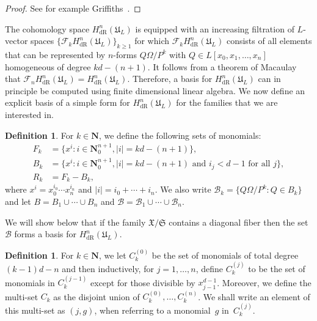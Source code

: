 \documentclass[a4paper,11pt]{article}
\numberwithin{equation}{section}
\providecommand{\abs}[1]{\lvert#1\rvert}                 %
\newcommand{\NN}{\mathbf{N}} %
\providecommand{\HdR}{H_{\text{dR}}}    %
\providecommand{\cB}{\mathcal{B}} %
\theoremstyle{definition}
\newtheorem{defn}[thm]{Definition}
\begin{document}
\begin{proof}
See for example Griffiths~\citep[\S 4]{Griffiths1969}.
\end{proof}

The cohomology space $\HdR^{n}(\mathfrak{U}_L)$ is equipped with 
an increasing filtration of $L$-vector spaces 
$\{\mathcal{F}_k \HdR^{n}(\mathfrak{U}_L) \}_{k \geq 1}$ 
for which $\mathcal{F}_k \HdR^{n}(\mathfrak{U}_L)$ consists of 
all elements that can be represented by $n$-forms $Q \Omega / P^k$ 
with $Q \in L[x_0, x_1, \dotsc, x_n]$ homogeneous of degree $kd - (n + 1)$. 
It follows from a theorem of Macaulay~\citep[\S 4, (4.11)]{Griffiths1969} 
that $\mathcal{F}_n \HdR^{n}(\mathfrak{U}_L)= \HdR^{n}(\mathfrak{U}_L)$. 
Therefore, a basis for $\HdR^{n}(\mathfrak{U}_L)$ can in principle be 
computed using finite dimensional linear algebra. We now define an explicit 
basis of a simple form for $\HdR^{n}(\mathfrak{U}_L)$ for the families 
that we are interested in.


\begin{defn} \label{defn:MonBasis}
For $k \in \NN$, we define the following sets of monomials: 
\begin{align*}
F_k & = \{ x^i : i \in \mathbf{N}_{0}^{n+1}, \abs{i} = k d - (n+1) \}, \\
B_k & = \{ x^i : i \in \mathbf{N}_{0}^{n+1}, \abs{i} = k d - (n+1) \text{ and $i_j < d-1$ for all $j$}\}, \\
R_k & = F_k - B_k,
\end{align*}
where $x^i = x_0^{i_0} \dotsm x_n^{i_n}$ and $\abs{i} = i_0 + \dotsb + i_n$. 
We also write $\cB_k = \{Q \Omega / P^k : Q \in B_k\}$ and let 
$B = B_1 \cup \dotsb \cup B_n$ and $\cB = \cB_1 \cup \dotsb \cup \cB_n$.
\end{defn}

We will show below that if the family $\mathfrak{X}/{\mathfrak{S}}$ contains 
a diagonal fiber then the set $\cB$ forms a basis for $\HdR^n(\mathfrak{U}_L)$.

\begin{defn} \label{defn:IndexSets}
For $k \in \NN$, we let $C_k^{(0)}$ be the set of monomials of total 
degree $(k-1)d - n$ and then inductively, for $j = 1, \dotsc, n$, define 
$C_k^{(j)}$ to be the set of monomials in $C_k^{(j-1)}$ except for those 
divisible by $x_{j-1}^{d-1}$.  Moreover, we define the multi-set $C_k$ as 
the disjoint union of $C_k^{(0)}, \dotsc, C_k^{(n)}$.  We shall write an 
element of this multi-set as $(j, g)$, when referring to a monomial~$g$ 
in~$C_k^{(j)}$.
\end{defn}
\end{document}
